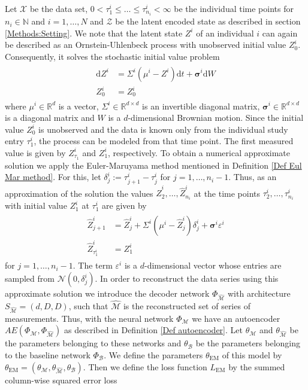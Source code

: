 \documentclass[11pt,titlepage]{article}
\newcommand{\R}{\mathbb{R}} %
\newcommand{\N}{\mathbb{N}} %
\theoremstyle{definition}
\theoremstyle{remark}
\begin{document}
	Let $\mathcal{X}$ be the data set, $0<\tau^i_1\leq \ldots\leq \tau^i_{n_i}<\infty$ be the individual time points for $n_i\in\N$ and $i=1,\ldots,N$ and $\mathcal{Z}$ be the latent encoded state as described in section \ref{Methods:Setting}. 
	We note that the latent state $Z^i$ of an individual $i$ can again be described as an Ornstein-Uhlenbeck process with unobserved initial 
	value $Z_0^i$. Consequently, it solves the stochastic initial value problem
	\begin{align*}
		\begin{split} 
			\mathrm{d}Z^i &= \Sigma^i(\mu^i- Z^i)\mathrm{d}t +\boldsymbol{\sigma}^i \mathrm{d}W\\
			Z^i_0 &= Z^i_0
		\end{split} 
	\end{align*}
	where $\mu^i\in\R^d$ is a vector, $\Sigma^i\in\R^{d\times d}$ is an invertible diagonal matrix, $\boldsymbol{\sigma}^i\in\R^{d\times d}$ is a diagonal matrix and $W$ is a $d$-dimensional Brownian motion. Since the initial value $Z_0^i$ is unobserved and the data is known only from the individual study entry $\tau^i_1$, the process can be modeled from that time point. The first measured value is given by  $Z^i_{\tau_1}$ and $Z^i_1$, respectively. 
	To obtain a numerical approximate solution we apply the Euler-Maruyama method mentioned in Definition \ref{Def Eul Mar method}. For this, let $\delta^i_{j}:= \tau^i_{j+1}-\tau^i_{j}$ for $j=1,\ldots,n_i -1$. 
	Thus, as an approximation of the solution the values $\hat{Z}^i_2,\ldots, \hat{Z}^i_{n_i}$ at the time points $\tau^i_2,\ldots,\tau^i_{n_i}$ with initial value $Z^i_1$ at $\tau^i_1$ are given by
	\begin{align*}
		\begin{split} 
			\hat{Z}^i_{j+1} &= \hat{Z}^i_{j} + \Sigma^i(\mu^i- \hat{Z}_{j}^i)\delta^i_j +\boldsymbol{\sigma}^i \varepsilon^i\\
			\hat{Z}^i_{\tau^i_1} &= Z^i_1
		\end{split} 
	\end{align*}
	for $j=1,\ldots, n_i -1$. The term $\varepsilon^i$ is a $d$-dimensional vector whose entries are sampled from $\mathcal{N}(0,\delta^i_j)$. In order to reconstruct the data series using this approximate solution we introduce the decoder network $\Phi_{\hat{\mathcal{M}}}$ with architecture $S_{\hat{\mathcal{M}}}=(d,D,D)$, such that $\hat{\mathcal{M}}$ is the reconstructed set of series of measurements. Thus, with the neural network $\Phi_\mathcal{M}$ we have an autoencoder $AE(\Phi_\mathcal{M},\Phi_{\hat{\mathcal{M}}})$ as described in Definition \ref{Def autoencoder}. Let $\theta_\mathcal{M}$ and $\theta_{\hat{\mathcal{M}}}$ be the parameters belonging to these networks and $\theta_\mathcal{B}$ be the parameters belonging to the baseline network $\Phi_\mathcal{B}$. We define the parameters $\theta_\mathrm{EM}$ of this model by $\theta_\mathrm{EM}= (\theta_\mathcal{M},\theta_{\hat{\mathcal{M}}}, \theta_\mathcal{B})$. Then we define the loss function $L_{\mathrm{EM}}$ by the summed column-wise squared error loss 
\end{document}
